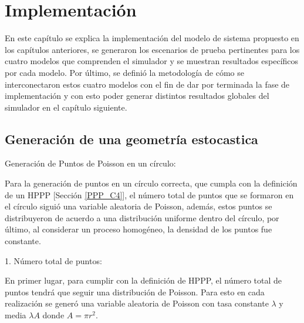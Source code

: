 
\chapter{Implementación} %

\label{Chapter6} %

En este capítulo se explica la implementación del modelo de sistema propuesto en los capítulos anteriores, se generaron los escenarios de prueba pertinentes para los cuatro modelos que comprenden el simulador y se muestran resultados específicos por cada modelo. Por último, se definió la metodología de cómo se interconectaron estos cuatro modelos con el fin de dar por terminada la fase de implementación y con esto poder generar distintos resultados globales del simulador en el capítulo siguiente.


\section{Generación de una geometría estocastica}\label{generarGeoEstocastica}

Generación de Puntos de Poisson en un círculo: \newline

Para la generación de puntos en un círculo correcta, que cumpla con la definición de un HPPP [Sección \ref{PPP_C4}], el número total de puntos que se formaron en el círculo siguió una variable aleatoria de Poisson, además, estos puntos se distribuyeron de acuerdo a una distribución uniforme dentro del círculo, por último, al considerar un proceso homogéneo, la densidad de los puntos fue constante.\newline

1. Número total de puntos:\newline

En primer lugar, para cumplir con la definición de HPPP, el número total de puntos tendrá que seguir una distribución de Poisson. Para esto en cada realización se generó una variable aleatoria de Poisson con tasa constante $\lambda$ y media $\lambda A$ donde $A=\pi r^{2}$. \newline

